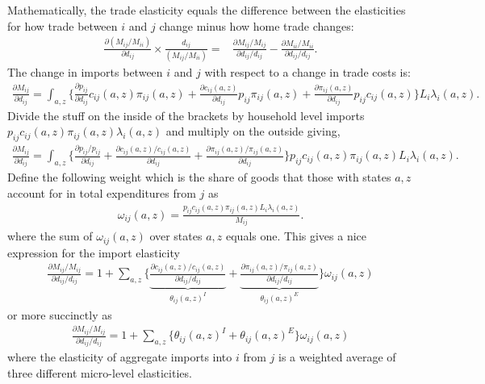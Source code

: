 \documentclass[12pt,pdftex]{article}
\begin{document}
\begin{onehalfspacing}
Mathematically, the trade elasticity equals the difference between the elasticities for how trade between $i$ and $j$ change minus how home trade changes:
\begin{align}
\frac{\partial ( M_{ij} / M_{ii} )}{\partial d_{ij}} \times \frac{d_{ij}}{( M_{ij} / M_{ii} )} =& \frac{\partial M_{ij} / M_{ij}}{\partial d_{ij} / d_{ij}}  - \frac{\partial M_{ii} / M_{ii}}{\partial d_{ij} / d_{ij}}.
\label{eq:def_trade_elasticity}
\end{align}
The change in imports between $i$ and $j$ with respect to a change in trade costs is:
\begin{align}
\frac{\partial  M_{ij}}{\partial d_{ij}} = \int_{a,z} \bigg \{\frac{\partial p_{ij}}{\partial d_{ij}} c_{ij}(a,z) \pi_{ij}(a,z) +  \frac{\partial c_{ij}(a,z)}{\partial d_{ij}} p_{ij} \pi_{ij}(a,z) +
 \frac{\partial \pi_{ij}(a,z)}{\partial d_{ij}} p_{ij}c_{ij}(a,z) \bigg \} L_i \lambda_{i}(a,z) .
\end{align}
Divide the stuff on the inside of the brackets by household level imports $p_{ij}c_{ij}(a,z)\pi_{ij}(a,z) \lambda_{i}(a,z)$ and multiply on the outside giving,
\begin{align}
\frac{\partial  M_{ij}}{\partial d_{ij}} = \int_{a,z}  \bigg \{ \frac{\partial p_{ij}/p_{ij}}{\partial d_{ij}}  + \frac{\partial c_{ij}(a,z)/ c_{ij}(a,z)}{\partial d_{ij}} +
 \frac{\partial \pi_{ij}(a,z) / \pi_{ij}(a,z)}{\partial d_{ij}}  \bigg \} p_{ij}c_{ij}(a,z)\pi_{ij}(a,z) L_i \lambda_{i}(a,z).
\end{align}
Define the following weight which is the share of goods that those with states $a,z$ account for in total expenditures from $j$ as
\begin{align}
\omega_{ij}(a,z) = \frac{p_{ij}c_{ij}(a,z)\pi_{ij}(a,z) L_i \lambda_{i}(a,z)}{M_{ij}}.
\end{align}
where the sum of $\omega_{ij}(a,z)$ over states $a,z$ equals one. This gives a nice expression for the import elasticity
\begin{align}
\frac{\partial  M_{ij} / M_{ij}}{\partial d_{ij} / d_{ij}} = 1 + \sum_{a,z} \bigg \{ \underbrace{ \frac{\partial c_{ij}(a,z)/ c_{ij}(a,z)}{\partial d_{ij} / d_{ij}} }_{\theta_{ij}(a,z)^{I}}+
\underbrace{\frac{\partial \pi_{ij}(a,z) / \pi_{ij}(a,z)}{\partial d_{ij} / d_{ij}} }_{\theta_{ij}(a,z)^{E}} \bigg \} \omega_{ij}(a,z)
\end{align}
or more succinctly as
\begin{align}
\frac{\partial  M_{ij} / M_{ij}}{\partial d_{ij} / d_{ij}} = 1 + \sum_{a,z} \bigg \{ \theta_{ij}(a,z)^{I} + \theta_{ij}(a,z)^{E} \bigg \}\omega_{ij}(a,z)
\end{align}
where the elasticity of aggregate imports into $i$ from $j$ is a weighted average of three different micro-level elasticities.


\end{onehalfspacing}
\end{document}
